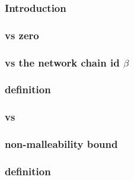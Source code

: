 \subsubsection{Introduction                                     } \label{rlp auth: comparisons: validity: intro}                                  %
\subsubsection{\locChainId{} vs zero                            } \label{rlp auth: comparisons: validity: chain id iszero}                        %
\subsubsection{\locChainId{} vs the network chain id $\beta$    } \label{rlp auth: comparisons: validity: chain id vs network chain id}           %
\subsubsection{\locChainIdIsZeroOrBeta{} definition             } \label{rlp auth: comparisons: validity: defining chain id is 0 or beta}         %
\subsubsection{\locNonce{} vs \maxNonce{}                       } \label{rlp auth: comparisons: validity: nonce EIP 2681 bound}                   %
\subsubsection{\locSignatureS{} non-malleability bound          } \label{rlp auth: comparisons: validity: signature s non malleability}           %
\subsubsection{\locCallEcrecoverExpression{} definition         } \label{rlp auth: comparisons: validity: defining call ecrecover expression}     %
